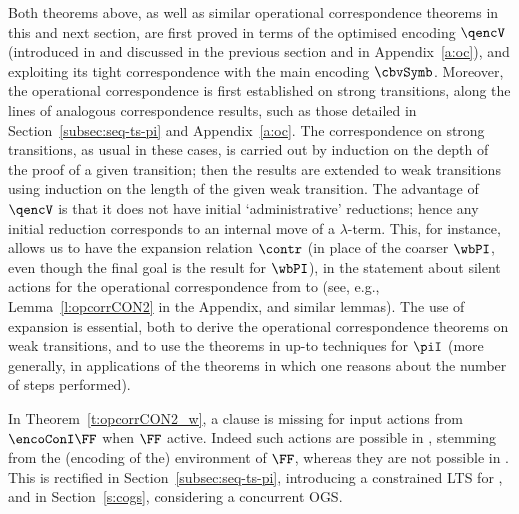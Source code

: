 \noindent
Both theorems above,  as well as similar operational correspondence theorems in this and next
section,  are first proved in terms of the optimised encoding  $\qencV$ 
(introduced in \cite{DurierHS18} and discussed in the previous section and in 
Appendix~\ref{a:oc}), 
and exploiting its
tight correspondence with the main encoding $\cbvSymb$. 
Moreover, 
  the operational correspondence 
is first established 
on strong
transitions,  along the lines of analogous correspondence results, such as  those detailed  in
Section~\ref{subsec:seq-ts-pi}  and Appendix~\ref{a:oc}. 
The correspondence on strong transitions, as usual in these cases, 
is carried out by  induction on the depth of the proof of a given transition; then the
 results are extended to weak transitions using induction on the length of the  given weak
 transition.  
 The advantage of   $\qencV$ is that it does not have initial
`administrative' reductions; hence any initial reduction corresponds to an internal move
of a $\lambda$-term.   This, for instance, allows us to have 
 the expansion relation  $\contr$ (in place of the coarser $\wbPI$, even though the final
 goal is  the result for  $\wbPI$), 
in the  statement about silent actions for the 
operational correspondence from \piI to \AOGS 
(see,  e.g., Lemma~\ref{l:opcorrCON2} in the Appendix, and similar lemmas). 
The use of expansion 
is
essential, both to derive the  operational correspondence theorems  on weak transitions,  and to use
the theorems in up-to techniques for  $\piI$ (more generally, in applications of the
theorems in which one reasons about the number of steps performed). 




In Theorem~\ref{t:opcorrCON2_w}, a  clause is 
 missing
 for
input actions from $ \encoConI \FF$ when 
 $\FF$ active. Indeed such actions are possible in \piI, stemming from the (encoding of
 the) environment of $\FF$, whereas they are not possible in \AOGS. This is rectified in
 Section~\ref{subsec:seq-ts-pi}, introducing a constrained LTS for \piI, and in Section~\ref{s:cogs}, 
 considering a concurrent OGS.   
 
